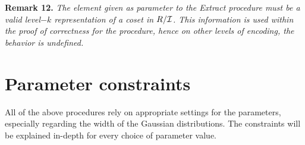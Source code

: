 \begin{enumerate}[label=(\alph*)]
\textbf{Remark 12.} \textit{The element given as parameter to the Extract procedure must be a valid level$-k$ representation of a coset in $R/\mathcal{I}$. This information is used within the proof of correctness for the procedure, hence on other levels of encoding, the behavior is undefined.}


\end{enumerate}

\section{Parameter constraints}

All of the above procedures rely on appropriate settings for the parameters, especially regarding the width of the Gaussian distributions. The constraints will be explained in-depth for every choice of parameter value.\\

